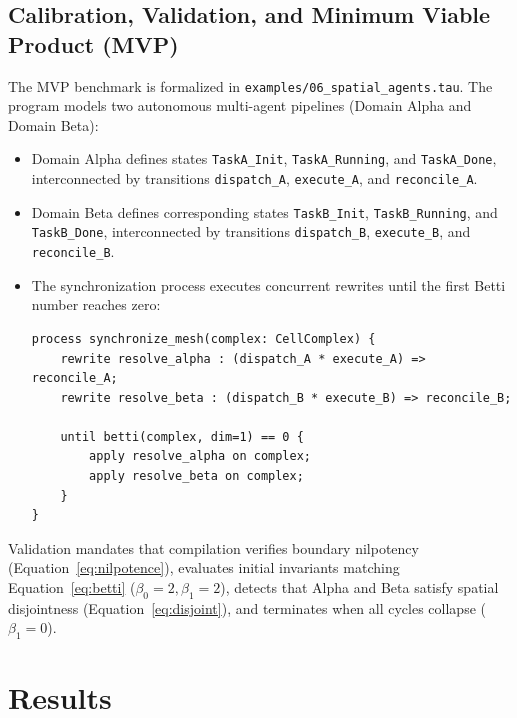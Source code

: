 \documentclass[10pt,a4paper]{article}
\begin{document}
\subsection{Calibration, Validation, and Minimum Viable Product (MVP)}
The MVP benchmark is formalized in \texttt{examples/06\_spatial\_agents.tau}. The program models two autonomous multi-agent pipelines (Domain Alpha and Domain Beta):
\begin{itemize}
    \item Domain Alpha defines states \texttt{TaskA\_Init}, \texttt{TaskA\_Running}, and \texttt{TaskA\_Done}, interconnected by transitions \texttt{dispatch\_A}, \texttt{execute\_A}, and \texttt{reconcile\_A}.
    \item Domain Beta defines corresponding states \texttt{TaskB\_Init}, \texttt{TaskB\_Running}, and \texttt{TaskB\_Done}, interconnected by transitions \texttt{dispatch\_B}, \texttt{execute\_B}, and \texttt{reconcile\_B}.
    \item The synchronization process executes concurrent rewrites until the first Betti number reaches zero:
\begin{lstlisting}
process synchronize_mesh(complex: CellComplex) {
    rewrite resolve_alpha : (dispatch_A * execute_A) => reconcile_A;
    rewrite resolve_beta : (dispatch_B * execute_B) => reconcile_B;

    until betti(complex, dim=1) == 0 {
        apply resolve_alpha on complex;
        apply resolve_beta on complex;
    }
}
\end{lstlisting}
\end{itemize}
Validation mandates that compilation verifies boundary nilpotency (Equation~\ref{eq:nilpotence}), evaluates initial invariants matching Equation~\ref{eq:betti} ($\beta_0 = 2, \beta_1 = 2$), detects that Alpha and Beta satisfy spatial disjointness (Equation~\ref{eq:disjoint}), and terminates when all cycles collapse ($\beta_1 = 0$).

\section{Results}
\end{document}
